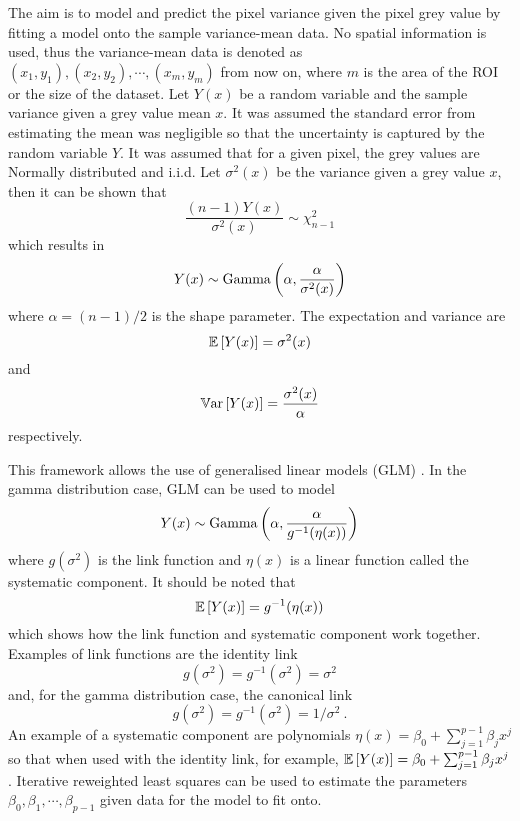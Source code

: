 The aim is to model and predict the pixel variance given the pixel grey value by fitting a model onto the sample variance-mean data. No spatial information is used, thus the variance-mean data is denoted as $(x_1,y_1),(x_2,y_2),\cdots,(x_m,y_m)$ from now on, where $m$ is the area of the ROI or the size of the dataset. Let $Y(x)$ be a random variable and the sample variance given a grey value mean $x$. It was assumed the standard error from estimating the mean was negligible so that the uncertainty is captured by the random variable $Y$. It was assumed that for a given pixel, the grey values are Normally distributed and i.i.d. Let $\sigma^2(x)$ be the variance given a grey value $x$, then it can be shown that
\begin{equation}
\dfrac{(n-1)Y(x)}{\sigma^2(x)}\sim\chi^2_{n-1}
\end{equation}
which results in
\begin{equation}
Y(x)\sim\operatorname{Gamma}\left(\alpha,\dfrac{\alpha}{\sigma^2(x)}\right)
\end{equation}
where $\alpha=(n-1)/2$ is the shape parameter. The expectation and variance are
\begin{equation}
\operatorname{\mathbb{E}}\left[Y(x)\right]=\sigma^2(x)
\end{equation}
and
\begin{equation}
\operatorname{\mathbb{V}ar}\left[Y(x)\right]=\dfrac{\sigma^2(x)}{\alpha}
\end{equation}
respectively.

This framework allows the use of generalised linear models (GLM) \citep{nelder1972generalized,nelder1972generalized_2, mccullagh1984generalized}. In the gamma distribution case, GLM can be used to model
\begin{equation}
Y(x)\sim\operatorname{Gamma}\left(\alpha,\dfrac{\alpha}{g^{-1}(\eta(x))}\right)
\end{equation}
where $g(\sigma^2)$ is the link function and $\eta(x)$ is a linear function called the systematic component. It should be noted that
\begin{equation}
  \operatorname{\mathbb{E}}\left[Y(x)\right]=g^{-1}(\eta(x))
\end{equation}
which shows how the link function and systematic component work together. Examples of link functions are the identity link
\begin{equation}
g(\sigma^2)=g^{-1}(\sigma^2)=\sigma^2
\end{equation}
and, for the gamma distribution case, the canonical link
\begin{equation}
g(\sigma^2)=g^{-1}(\sigma^2)=1/\sigma^2 \ .
\end{equation}
An example of a systematic component are polynomials $\eta(x)=\beta_0+\sum_{j=1}^{p-1}\beta_j x^j$ so that when used with the identity link, for example, $\operatorname{\mathbb{E}}\left[Y(x)\right] = \beta_0+\sum_{j=1}^{p-1}\beta_j x^j$. Iterative reweighted least squares \citep{friedman2001elements} can be used to estimate the parameters $\beta_0, \beta_1, \cdots, \beta_{p-1}$ given data for the model to fit onto.

